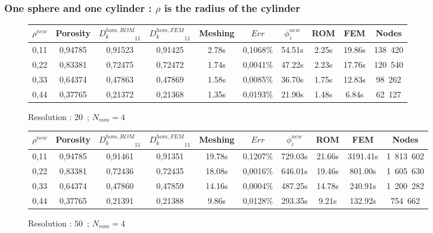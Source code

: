 {\subsubsection{One sphere and one cylinder : $\rho$ is the radius of the cylinder}

\begin{figure}[H]%
%
\begin{center}
\begin{tabular}{|c|c||c|c||c|c||c|c||c||c|}
\hline
\rowcolor{lightgray} $\rho^{new}$&Porosity&${D_k^{hom,ROM}}_{11}$&${D_k^{hom,FEM}}_{11}$&Meshing&$Err$&$\phi_i^{new}$&ROM&FEM&Nodes\\
\hline
0,11&0,94785&0,91523&0,91425&2.78s&0,1068\%&54.51s&2.25s&19.86s&138\ 420\\
\hline
0,22&0,83381&0,72475&0,72472&1.74s&0,0041\%&47.22s&2.23s&17.76s&120\ 540\\
\hline
0,33&0,64374&0,47863&0,47869&1.58s&0,0085\%&36.70s&1.75s&12.83s&98\ 262\\
\hline
0,44&0,37765&0,21372&0,21368&1.35s&0,0193\%&21.90s&1.48s&6.84s&62\ 127\\
\hline
\end{tabular}
\end{center}
\caption{Resolution : $20$\ ; $N_{rom}=4$}
%
\end{figure}

\begin{figure}[H]%
%
\begin{center}
\begin{tabular}{|c|c||c|c||c|c||c|c||c||c|}
\hline
\rowcolor{lightgray} $\rho^{new}$&Porosity&${D_k^{hom,ROM}}_{11}$&${D_k^{hom,FEM}}_{11}$&Meshing&$Err$&$\phi_i^{new}$&ROM&FEM&Nodes\\
\hline
0,11&0,94785&0,91461&0,91351&19.78s&0,1207\%&729.03s&21.66s&3191.41s&1\ 813\ 602\\
\hline
0,22&0,83381&0,72436&0,72435&18.08s&0,0016\%&646.01s&19.46s&801.00s&1\ 605\ 630\\
\hline
0,33&0,64374&0,47860&0,47859&14.16s&0,0004\%&487.25s&14.78s&240.91s&1\ 200\ 282\\
\hline
0,44&0,37765&0,21391&0,21388&9.86s&0,0128\%&293.35s&9.21s&132.92s&754\ 662\\
\hline
\end{tabular}
\end{center}
\caption{Resolution : $50$\ ; $N_{rom}=4$}
%
\end{figure}

\ligneinter

}
